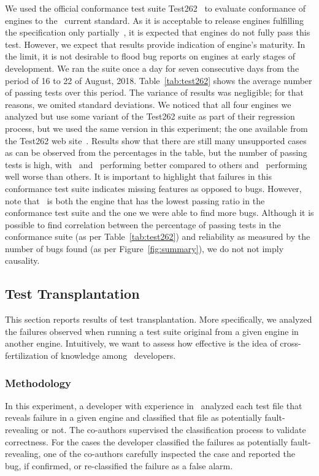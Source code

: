 \documentclass[10pt,conference,anonymous]{IEEEtran}
\begin{document}
We used the official conformance test suite
Test262~\cite{ecma262-conformance-suite} to evaluate conformance of
engines to the \js\ current standard. As it is acceptable to release
engines fulfilling the specification only partially~\cite{kangax}, it
is expected that engines do not fully pass this test. However, we
expect that results provide indication of engine's maturity. In the
limit, it is not desirable to flood bug reports on engines at early
stages of development. We ran the suite once a day for seven
consecutive days from the period of 16 to 22 of August,
2018. Table~\ref{tab:test262} shows the average number of passing
tests over this period. The variance of results was negligible; for
that reasons, we omited standard deviations. We noticed that all four
engines we analyzed but \chakra{} use some variant of the Test262
suite as part of their regression process, but we used the same
version in this experiment; the one available from the Test262 web
site~\cite{ecma262-conformance-suite}. Results show that there are
still many unsupported cases as can be observed from the percentages
in the table, but the number of passing tests is high, with
\veight\ and \smonkey\ performing better compared to others and
\chakra\ performing well worse than others. It is important to
highlight that failures in this conformance test suite indicates
missing features as opposed to bugs. However, note that \chakra\ is
both the engine that has the lowest passing ratio in the conformance
test suite and the one we were able to find more bugs. Although it is
possible to find correlation between the percentage of passing tests
in the conformance suite (as per Table~\ref{tab:test262}) and reliability as
measured by the number of bugs found (as per
Figure~\ref{fig:summary}), we do not not imply causality.


\subsection{Test Transplantation}
\label{sec:transplantation}

This section reports results of test transplantation. More
specifically, we analyzed the failures observed when running a test
suite original from a given engine in another engine. Intuitively, we
want to assess how effective is the idea of cross-fertilization of
knowledge among \js\ developers.

\vspace{0.5ex}
\subsubsection{Methodology}
\label{sec:methodology}
In this experiment, a developer with experience in \js\ analyzed each
test file that reveals failure in a given engine and classified that
file as potentially fault-revealing or not. The co-authors supervised
the classification process to validate correctness. For the cases the
developer classified the failures as potentially fault-revealing, one
of the co-authors carefully inspected the case and reported the bug,
if confirmed, or re-classified the failure as a false alarm.
\end{document}
